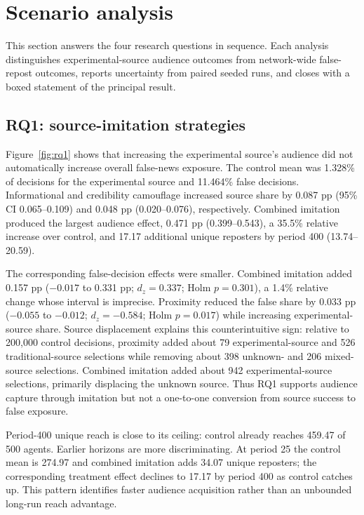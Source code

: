 \providecommand{\rqsummary}[1]{%
\begin{center}\begingroup
\setlength{\fboxsep}{8pt}%
\fcolorbox{black!30}{black!5}{\parbox{.88\linewidth}{\itshape #1\/}}
\endgroup\end{center}}

\section{Scenario analysis}

This section answers the four research questions in sequence. Each analysis distinguishes experimental-source audience outcomes from network-wide false-repost outcomes, reports uncertainty from paired seeded runs, and closes with a boxed statement of the principal result.

\subsection{RQ1: source-imitation strategies}

Figure~\ref{fig:rq1} shows that increasing the experimental source's audience did not automatically increase overall false-news exposure. The control mean was 1.328\% of decisions for the experimental source and 11.464\% false decisions. Informational and credibility camouflage increased source share by 0.087 pp (95\% CI 0.065--0.109) and 0.048 pp (0.020--0.076), respectively. Combined imitation produced the largest audience effect, 0.471 pp (0.399--0.543), a 35.5\% relative increase over control, and 17.17 additional unique reposters by period 400 (13.74--20.59).

The corresponding false-decision effects were smaller. Combined imitation added 0.157 pp ($-0.017$ to 0.331 pp; $d_z=0.337$; Holm $p=0.301$), a 1.4\% relative change whose interval is imprecise. Proximity reduced the false share by 0.033 pp ($-0.055$ to $-0.012$; $d_z=-0.584$; Holm $p=0.017$) while increasing experimental-source share. Source displacement explains this counterintuitive sign: relative to 200,000 control decisions, proximity added about 79 experimental-source and 526 traditional-source selections while removing about 398 unknown- and 206 mixed-source selections. Combined imitation added about 942 experimental-source selections, primarily displacing the unknown source. Thus RQ1 supports audience capture through imitation but not a one-to-one conversion from source success to false exposure.

Period-400 unique reach is close to its ceiling: control already reaches 459.47 of 500 agents. Earlier horizons are more discriminating. At period 25 the control mean is 274.97 and combined imitation adds 34.07 unique reposters; the corresponding treatment effect declines to 17.17 by period 400 as control catches up. This pattern identifies faster audience acquisition rather than an unbounded long-run reach advantage.

